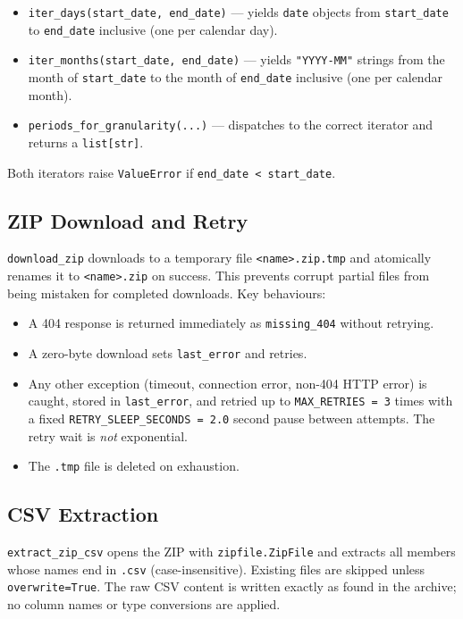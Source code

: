 \documentclass[11pt,a4paper]{article}
\begin{document}
\begin{itemize}
  \item \texttt{iter\_days(start\_date, end\_date)} --- yields
        \texttt{date} objects from \texttt{start\_date} to
        \texttt{end\_date} inclusive (one per calendar day).
  \item \texttt{iter\_months(start\_date, end\_date)} --- yields
        \texttt{"YYYY-MM"} strings from the month of
        \texttt{start\_date} to the month of \texttt{end\_date}
        inclusive (one per calendar month).
  \item \texttt{periods\_for\_granularity(...)} --- dispatches to the
        correct iterator and returns a \texttt{list[str]}.
\end{itemize}

Both iterators raise \texttt{ValueError} if \texttt{end\_date <
start\_date}.

\subsection{ZIP Download and Retry}

\texttt{download\_zip} downloads to a temporary file
\texttt{<name>.zip.tmp} and atomically renames it to \texttt{<name>.zip}
on success. This prevents corrupt partial files from being mistaken
for completed downloads. Key behaviours:

\begin{itemize}
  \item A 404 response is returned immediately as
        \texttt{missing\_404} without retrying.
  \item A zero-byte download sets \texttt{last\_error} and retries.
  \item Any other exception (timeout, connection error, non-404
        HTTP error) is caught, stored in \texttt{last\_error}, and
        retried up to \texttt{MAX\_RETRIES = 3} times with a fixed
        \texttt{RETRY\_SLEEP\_SECONDS = 2.0} second pause between
        attempts. The retry wait is \emph{not} exponential.
  \item The \texttt{.tmp} file is deleted on exhaustion.
\end{itemize}

\subsection{CSV Extraction}

\texttt{extract\_zip\_csv} opens the ZIP with
\texttt{zipfile.ZipFile} and extracts all members whose names end in
\texttt{.csv} (case-insensitive). Existing files are skipped unless
\texttt{overwrite=True}. The raw CSV content is written exactly as
found in the archive; no column names or type conversions are applied.
\end{document}
